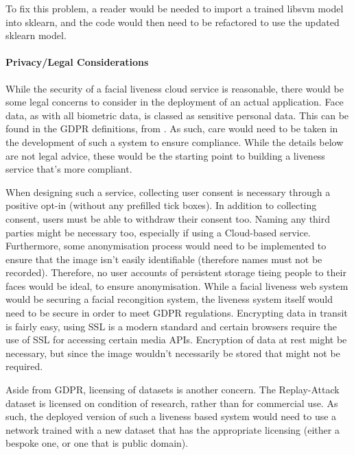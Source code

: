 \documentclass[11pt,a4paper]{article}
\begin{document}
        To fix this problem, a reader would be needed to import a trained libsvm model into sklearn, and the code would then need to be refactored to use the updated sklearn model. 

        \paragraph{Privacy/Legal Considerations}
            While the security of a facial liveness cloud service is reasonable, there would be some legal concerns to consider in the deployment of an actual application.
            Face data, as with all biometric data, is classed as sensitive personal data. This can be found in the GDPR definitions, from \cite{GDPRDefinitions}. As such, care would need to be taken in the development of such a system
            to ensure compliance. While the details below are not legal advice, these would be the starting point to building a liveness service that's more compliant.

            When designing such a service, collecting user consent is necessary through a positive opt-in (without any prefilled tick boxes). In addition to collecting consent, users must be able to withdraw their consent too.
            Naming any third parties might be necessary too, especially if using a Cloud-based service. Furthermore, some anonymisation process would need to be implemented to ensure that the image isn't easily identifiable (therefore names
            must not be recorded). Therefore, no user accounts of persistent storage tieing people to their faces would be ideal, to ensure anonymisation. While a facial liveness web system would be securing a facial recongition system, the 
            liveness system itself would need to be secure in order to meet GDPR regulations. \cite{GDPRForFacialRecognition} Encrypting data in transit is fairly easy, using SSL is a modern standard
            and certain browsers require the use of SSL for accessing certain media APIs. Encryption of data at rest might be necessary, but since the image wouldn't necessarily be stored that might not be required. 
            

            Aside from GDPR, licensing of datasets is another concern. The Replay-Attack dataset is licensed on condition of research, rather than for commercial use. 
            As such, the deployed version of such a liveness based system would need to use a network trained with a new dataset that has the appropriate licensing (either a bespoke one, or one that is public domain).
\end{document}
